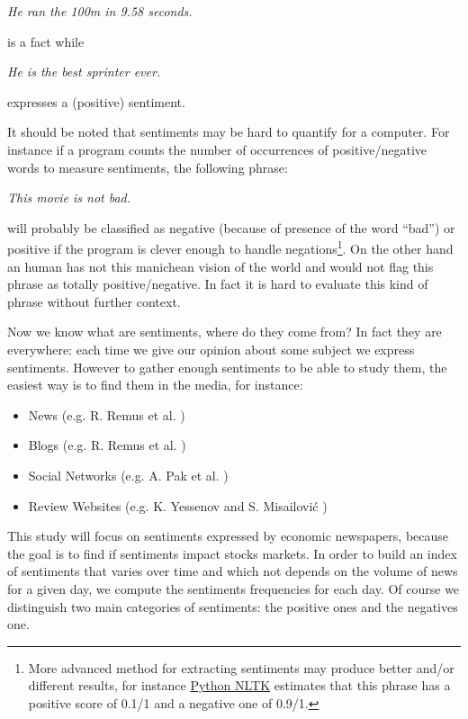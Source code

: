 \documentclass[12pt]{report}
\begin{document}
\begin{center}
	\emph{He ran the 100m in 9.58 seconds.}
\end{center} is a fact while

\begin{center}
	\emph{He is the best sprinter ever.}
\end{center}

expresses a (positive) sentiment.

It should be noted that sentiments may be hard to quantify for a computer. For instance if a program counts the number of occurrences of positive/negative words to measure sentiments, the following phrase:

\begin{center}
	\emph{This movie is not bad.}
\end{center}

will probably be classified as negative (because of presence of the word ``bad'') or positive if the program is clever enough to handle negations\footnote{More advanced method for extracting sentiments may produce better and/or different results, for instance \href{http://text-processing.com/demo/sentiment/}{Python NLTK} estimates that this phrase has a positive score of 0.1/1 and a negative one of 0.9/1.}. On the other hand an human has not this manichean vision of the world and would not flag this phrase as totally positive/negative. In fact it is hard to evaluate this kind of phrase without further context.

Now we know what are sentiments, where do they come from? In fact they are everywhere: each time we give our opinion about some subject we express sentiments. However to gather enough sentiments to be able to study them, the easiest way is to find them in the media, for instance:
\begin{itemize}
	\item News (e.g. R. Remus et al. \cite{remus09})
	\item Blogs (e.g. R. Remus et al. \cite{remus09})
	\item Social Networks (e.g. A. Pak et al. \cite{pak10})
	\item Review Websites (e.g. K. Yessenov and S. Misailovi\'c \cite{yessenov09})
\end{itemize}

This study will focus on sentiments expressed by economic newspapers, because the goal is to find if sentiments impact stocks markets. In order to build an index of sentiments that varies over time and which not depends on the volume of news for a given day, we compute the sentiments frequencies for each day. Of course we distinguish two main categories of sentiments: the positive ones and the negatives one.
\end{document}
